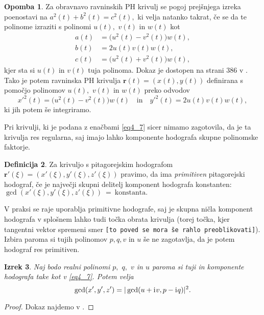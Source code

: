 \documentclass[12pt,a4paper,twoside]{article}
\newcommand{\iu}{\mathrm{i}\mkern1mu} %
\theoremstyle{definition} %
\newtheorem{definicija}{Definicija}[section]
\newtheorem{opomba}[definicija]{Opomba}
\theoremstyle{plain} %
\newtheorem{izrek}[definicija]{Izrek}
\numberwithin{equation}{section}  %
\newcommand{\rV}{\mathbf{r}}
\begin{document}
\begin{opomba}
	\label{opomba1}
	Za obravnavo ravninskih PH krivulj se pogoj prejšnjega izreka poenostavi na $a^2(t)+b^2(t)=c^2(t),$ ki velja natanko takrat, če se da te polinome izraziti s polinomi $u(t),$ $v(t)$ in $w(t)$ kot
	\begin{align}
		a(t)&=\big(u^2(t)-v^2(t)\big)w(t),\nonumber\\
		b(t)&=2u(t)v(t)w(t),\nonumber\\
		c(t)&=\big(u^2(t)+v^2(t)\big)w(t),\label{ravninska_PH}
	\end{align}
	kjer sta si $u(t)$ in $v(t)$ tuja polinoma. Dokaz je dostopen na strani 386 v \cite{farouki2008pythagorean}. Tako je potem ravninska PH krivulja $\rV(t)=(x(t),y(t))$ definirana s pomočjo polinomov $u(t),$ $v(t)$ in $w(t)$ preko odvodov
	\begin{equation}
		\label{poly_ravninska_PH}
		x'^2(t)=\big(u^2(t)-v^2(t)\big)w(t)\quad\text{in}\quad y'^2(t)=2u(t)v(t)w(t),
	\end{equation}
	ki jih potem še integriramo.
\end{opomba}

Pri krivulji, ki je podana z enačbami \eqref{eq4_7} sicer nimamo zagotovila, da je ta krivulja res regularna, saj imajo lahko komponente hodografa skupne polinomske faktorje.

\begin{definicija}
	\label{primitiven_hodo}
	Za krivuljo s pitagorejskim hodografom $\rV'(\xi)=(x'(\xi),y'(\xi),z'(\xi))$ pravimo, da ima \emph{primitiven} pitagorejski hodograf, če je največji skupni delitelj komponent hodografa konstanten: $\gcd(x'(\xi),y'(\xi),z'(\xi))~=~\mathrm{konstanta}.$
\end{definicija}

V praksi se raje uporablja primitivne hodografe, saj je skupna ničla komponent hodografa v splošnem lahko tudi točka obrata krivulja (torej točka, kjer tangentni vektor spremeni smer \texttt{[to poved se mora še rahlo preoblikovati]}). Izbira paroma si tujih polinomov $p,q,v$ in $u$ še ne zagotavlja, da je potem hodograf res primitiven. 

\begin{izrek}
	Naj bodo realni polinomi $p,$ $q,$ $v$ in $u$ paroma si tuji in komponente hodografa take kot v \eqref{eq4_7}. Potem velja
	\begin{equation}
		\gcd(x',y',z')=|\gcd(u+\iu v,p-\iu q)|^2.
	\end{equation}
\end{izrek}
\begin{proof}
	Dokaz najdemo v \cite{faroukietal2004}.
\end{proof}
\end{document}
